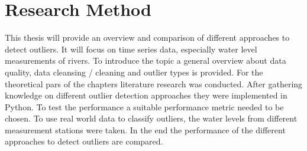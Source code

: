 \section{Research Method}
This thesis will provide an overview and comparison of different approaches to detect outliers. It will focus on time series data, especially water level measurements of rivers. To introduce the topic a general overview about data quality, data cleansing / cleaning and outlier types is provided. For the theoretical pars of the chapters literature research was conducted. After gathering knowledge on different outlier detection approaches they were implemented in Python. To test the performance a suitable performance metric needed to be chosen. To use real world data to classify outliers, the water levels from different measurement stations were taken. In the end the performance of the different approaches to detect outliers are compared.

